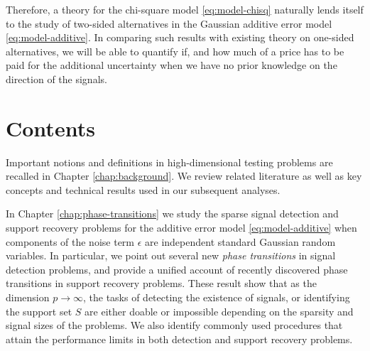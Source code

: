 Therefore, a theory for the chi-square model \eqref{eq:model-chisq} naturally lends itself to the study of two-sided alternatives in the Gaussian additive error model \eqref{eq:model-additive}.
In comparing such results with existing theory on one-sided alternatives, we will be able to quantify if, and how much of a price has to be paid for the additional uncertainty when we have no prior knowledge on the direction of the signals.


\section{Contents}

Important notions and definitions in high-dimensional testing problems are recalled in Chapter \ref{chap:background}. 
We review related literature as well as key concepts and technical results used in our subsequent analyses.

In Chapter \ref{chap:phase-transitions} we study the sparse signal detection and support recovery problems for the additive error model \eqref{eq:model-additive} when components of the noise term $\epsilon$ are independent standard Gaussian random variables.
In particular, we point out several new \emph{phase transitions} in signal detection problems, and provide a unified account of recently discovered phase transitions in support recovery problems.
These result show that as the dimension $p\to\infty$, the tasks of detecting the existence of signals, or identifying the support set $S$ are either doable or impossible depending on the sparsity and signal sizes of the problems.
We also identify commonly used procedures that attain the performance limits in both detection and support recovery problems.

